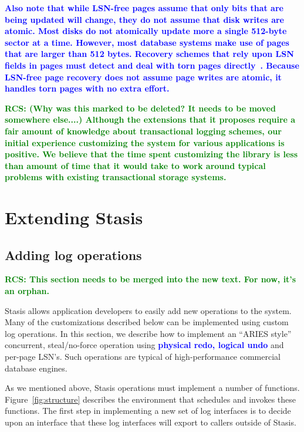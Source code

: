 \documentclass[letterpaper,twocolumn,10pt]{article}
\newcommand{\yad}{Stasis\xspace}
\newcommand{\diff}[1]{\textcolor{blue}{\bf #1}}
\newcommand{\rcs}[1]{\textcolor{green}{\bf RCS: #1}}
\begin{document}
\diff{Also note that while LSN-free pages assume that only bits that
are being updated will change, they do not assume that disk writes are
atomic.  Most disks do not atomically update more a single 512-byte
sector at a time.  However, most database systems make use of pages
that are larger than 512 bytes.  Recovery schemes that rely upon LSN
fields in pages must detect and deal with torn pages
directly~\cite{tornPageStuffMohan}.  Because LSN-free page recovery
does not assume page writes are atomic, it handles torn pages with no
extra effort.}

\rcs{ (Why was this marked to be deleted?  It needs to be moved somewhere else....)
Although the extensions that it proposes
require a fair amount of knowledge about transactional logging
schemes, our initial experience customizing the system for various
applications is positive.  We believe that the time spent customizing
the library is less than amount of time that it would take to work
around typical problems with existing transactional storage systems.
}



\section{Extending \yad}
\subsection{Adding log operations}
\label{sec:wal}

\rcs{This section needs to be merged into the new text.  For now, it's an orphan.}

\yad allows application developers to easily add new operations to the
system.  Many of the customizations described below can be implemented
using custom log operations.  In this section, we describe how to implement an
``ARIES style'' concurrent, steal/no-force operation using 
\diff{physical redo, logical undo} and per-page LSN's.
Such operations are typical of high-performance commercial database
engines.

As we mentioned above, \yad operations must implement a number of
functions.  Figure~\ref{fig:structure} describes the environment that
schedules and invokes these functions.  The first step in implementing
a new set of log interfaces is to decide upon an interface that these log
interfaces will export to callers outside of \yad.  
\end{document}
